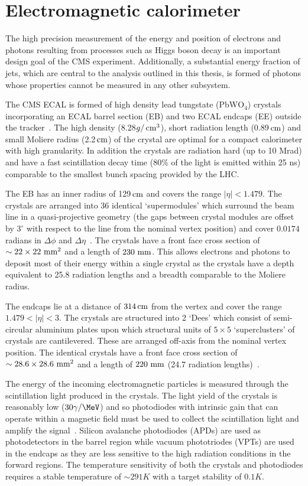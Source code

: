 \section{Electromagnetic calorimeter}

The high precision measurement of the energy and position of electrons and photons resulting from 
processes such as Higgs boson decay is an important design goal of the CMS experiment. Additionally,
a substantial energy fraction of jets, which are central to the analysis outlined in this
thesis, is formed of photons whose properties cannot be measured in any other subsystem.

The CMS ECAL is formed of high density lead tungstate (PbW$\text{O}_4$) crystals incorporating an ECAL barrel section (EB) 
and two ECAL endcaps (EE) outside the tracker~\cite{ecal_tdr}. The high density (8.28$g/\,\text{cm}^3$), short radiation length (0.89$\,\text{cm}$) 
and small Moliere radius (2.2$\,\text{cm}$) of the crystal are optimal for a compact calorimeter with high granularity. In addition the 
crystals are radiation hard (up to 10 Mrad) and have a fast scintillation decay time (80\% of the light is emitted within 25 ns)
comparable to the smallest bunch spacing provided by the LHC. 

The EB has an inner radius of 129$\,\text{cm}$ and covers the range $|\eta| < 1.479$. The crystals are arranged into 36 
identical `supermodules' which surround the beam line in a quasi-projective geometry (the gaps between
crystal modules are offset by $3^\circ$ with respect to the line from the nominal vertex position)
and cover $0.0174$ radians in $\Delta\phi$ and $\Delta\eta$~\cite{CMS}. The crystals have a front face cross section 
of $\sim 22\times22\,\,\text{mm}^2$ and a length of $230\,\,\text{mm}$. This allows electrons and photons to deposit most of their  
energy within a single crystal as the crystals have a depth equivalent to 25.8 radiation lengths and 
a breadth comparable to the Moliere radius. 

The endcaps lie at a distance of $314 \,\text{cm}$ from the vertex and cover the range $1.479<|\eta|<3$. The crystals
are structured into 2 `Dees' which consist of semi-circular aluminium plates upon which structural units of 
$5\times5$ `superclusters' of crystals are cantilevered. These are arranged off-axis from
the nominal vertex position. The identical crystals have a front face cross section of 
$\sim 28.6\times28.6\,\,\text{mm}^2$ and a length of $220\,\,\text{mm}$ (24.7 radiation lengths)~\cite{CMS}.

The energy of the incoming electromagnetic particles is measured through the scintillation light produced
in the crystals. The light yield of the crystals is reasonably low ($30\gamma/\MeV$)
and so photodiodes with intrinsic gain that can operate within a magnetic field must be used to collect 
the scintillation light and amplify the signal~\cite{ecal_tdr}. Silicon avalanche photodiodes (APDs) are used as 
photodetectors in the barrel region while vacuum phototriodes (VPTs) are used in the endcaps as they are less sensitive
to the high radiation conditions in the forward regions. The temperature sensitivity of both the crystals 
and photodiodes requires a stable temperature of $\sim291K$ with a target stability of $0.1K$. 

